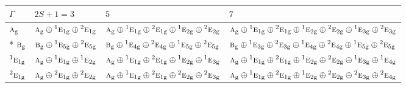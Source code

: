 \documentclass[10pt,a4paper]{article}
\numberwithin{equation}{section}
\newcommand{\irr}[1]{\text{\normalfont\scshape #1}}
\newcommand{\conjpair}[1]{{}^{#1}}
\newcommand{\ptag}[1]{\mathrm{#1}}
\begin{document}
{\small\setlength{\tabcolsep}{3pt}\begin{longtable}{@{}l>{\RaggedRight\arraybackslash}p{}>{\RaggedRight\arraybackslash}p{}>{\RaggedRight\arraybackslash}p{}@{}}\toprule
$\Gamma$ & $2S + 1 = 3$ & $5$ & $7$\\\midrule\endhead
\bottomrule\endfoot\endlastfoot
$\irr{a}_{\ptag{g}}$ & $\irr{a}_{\ptag{g}}\oplus \conjpair{1}\irr{e}_{1\ptag{g}}\oplus \conjpair{2}\irr{e}_{1\ptag{g}}$ & $\irr{a}_{\ptag{g}}\oplus \conjpair{1}\irr{e}_{1\ptag{g}}\oplus \conjpair{2}\irr{e}_{1\ptag{g}}\oplus \conjpair{1}\irr{e}_{2\ptag{g}}\oplus \conjpair{2}\irr{e}_{2\ptag{g}}$ & $\irr{a}_{\ptag{g}}\oplus \conjpair{1}\irr{e}_{1\ptag{g}}\oplus \conjpair{2}\irr{e}_{1\ptag{g}}\oplus \conjpair{1}\irr{e}_{2\ptag{g}}\oplus \conjpair{2}\irr{e}_{2\ptag{g}}\oplus \conjpair{1}\irr{e}_{3\ptag{g}}\oplus \conjpair{2}\irr{e}_{3\ptag{g}}$\\*
$\irr{b}_{\ptag{g}}$ & $\irr{b}_{\ptag{g}}\oplus \conjpair{1}\irr{e}_{5\ptag{g}}\oplus \conjpair{2}\irr{e}_{5\ptag{g}}$ & $\irr{b}_{\ptag{g}}\oplus \conjpair{1}\irr{e}_{4\ptag{g}}\oplus \conjpair{2}\irr{e}_{4\ptag{g}}\oplus \conjpair{1}\irr{e}_{5\ptag{g}}\oplus \conjpair{2}\irr{e}_{5\ptag{g}}$ & $\irr{b}_{\ptag{g}}\oplus \conjpair{1}\irr{e}_{3\ptag{g}}\oplus \conjpair{2}\irr{e}_{3\ptag{g}}\oplus \conjpair{1}\irr{e}_{4\ptag{g}}\oplus \conjpair{2}\irr{e}_{4\ptag{g}}\oplus \conjpair{1}\irr{e}_{5\ptag{g}}\oplus \conjpair{2}\irr{e}_{5\ptag{g}}$\\
$\conjpair{1}\irr{e}_{1\ptag{g}}$ & $\irr{a}_{\ptag{g}}\oplus \conjpair{1}\irr{e}_{1\ptag{g}}\oplus \conjpair{1}\irr{e}_{2\ptag{g}}$ & $\irr{a}_{\ptag{g}}\oplus \conjpair{1}\irr{e}_{1\ptag{g}}\oplus \conjpair{2}\irr{e}_{1\ptag{g}}\oplus \conjpair{1}\irr{e}_{2\ptag{g}}\oplus \conjpair{1}\irr{e}_{3\ptag{g}}$ & $\irr{a}_{\ptag{g}}\oplus \conjpair{1}\irr{e}_{1\ptag{g}}\oplus \conjpair{2}\irr{e}_{1\ptag{g}}\oplus \conjpair{1}\irr{e}_{2\ptag{g}}\oplus \conjpair{2}\irr{e}_{2\ptag{g}}\oplus \conjpair{1}\irr{e}_{3\ptag{g}}\oplus \conjpair{1}\irr{e}_{4\ptag{g}}$\\
$\conjpair{2}\irr{e}_{1\ptag{g}}$ & $\irr{a}_{\ptag{g}}\oplus \conjpair{2}\irr{e}_{1\ptag{g}}\oplus \conjpair{2}\irr{e}_{2\ptag{g}}$ & $\irr{a}_{\ptag{g}}\oplus \conjpair{1}\irr{e}_{1\ptag{g}}\oplus \conjpair{2}\irr{e}_{1\ptag{g}}\oplus \conjpair{2}\irr{e}_{2\ptag{g}}\oplus \conjpair{2}\irr{e}_{3\ptag{g}}$ & $\irr{a}_{\ptag{g}}\oplus \conjpair{1}\irr{e}_{1\ptag{g}}\oplus \conjpair{2}\irr{e}_{1\ptag{g}}\oplus \conjpair{1}\irr{e}_{2\ptag{g}}\oplus \conjpair{2}\irr{e}_{2\ptag{g}}\oplus \conjpair{2}\irr{e}_{3\ptag{g}}\oplus \conjpair{2}\irr{e}_{4\ptag{g}}$\\

\end{longtable}}
\end{document}
